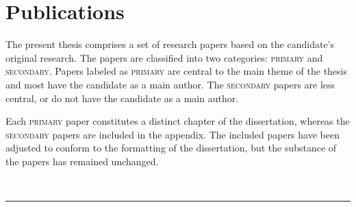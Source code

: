 
\chapter[publications]{Publications}

The present thesis comprises a set of research papers based on the candidate's original research. The papers are classified into two categories: \textsc{primary} and \textsc{secondary}. 
Papers labeled as \textsc{primary} are central to the main theme of the thesis and most have the candidate as a main author. The \textsc{secondary} papers are less central, or do not have the candidate as a main author.

\noindent Each \textsc{primary} paper constitutes a distinct chapter of the dissertation, whereas the \textsc{secondary} papers are included in the appendix. The included papers have been adjusted to conform to the formatting of the dissertation, but the substance of the papers has remained unchanged.


\vspace{5mm}

\raggedright\par\noindent\hspace{8mm}{\Large\scshape primary}\\[-2mm]

\raggedleft\rule{\textwidth - 8mm}{0.4pt}

\begin{enumerate}[leftmargin=8mm,topsep=0mm,label={[\Alph*]}]
    \item {}
    \item {}
    \item {} 
    \item {}
\end{enumerate}

\newpage

\raggedright\par\noindent\hspace{8mm}{\Large\scshape secondary}\\[-2mm]


